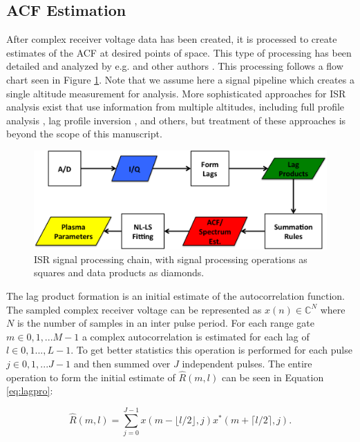 \subsection{ACF Estimation}
After complex receiver voltage data has been created, it is processed to create estimates of the ACF at desired points of space. This type of processing has been detailed and analyzed by e.g. \cite{farley1969} and other authors \cite{nygren1996}. This processing follows a flow chart seen in Figure \ref{fig:chain}.  Note that we assume here a signal pipeline which creates a single altitude measurement for analysis. More sophisticated approaches for ISR analysis exist that use information from multiple altitudes, including full profile analysis \cite{RDS:RDS3308}, lag profile inversion \cite{Virtanen:20082vx}, and others, but treatment of these approaches is beyond the scope of this manuscript.

\begin{figure}[!t]
\centering
\includegraphics[width=6in]{datastackchain}
\caption{ISR signal processing chain, with signal processing operations as squares and data products as diamonds.}
\label{fig:chain}
\end{figure}


The lag product formation is an initial estimate of the autocorrelation function. The sampled complex receiver voltage can be represented as $x(n) \in\mathbb{C}^N$ where $N$ is the number of samples in an inter pulse period. For each range gate $m\in 0,1,...M-1$ a complex autocorrelation is estimated for each lag of $l \in 0,1...,L-1$.  To get better statistics this operation is performed for each pulse $j\in 0,1,...J-1$ and then summed over $J$ independent pulses. The entire operation to form the initial estimate of $\widehat{R}(m,l)$ can be seen in Equation \ref{eq:lagpro}:

\begin{equation}
\label{eq:lagpro}
\widehat{R}(m,l) = \displaystyle\sum\limits_{j=0}^{J-1} x(m-\lfloor l/2\rfloor,j)x^*(m+\lceil l/2 \rceil,j).
\end{equation}

